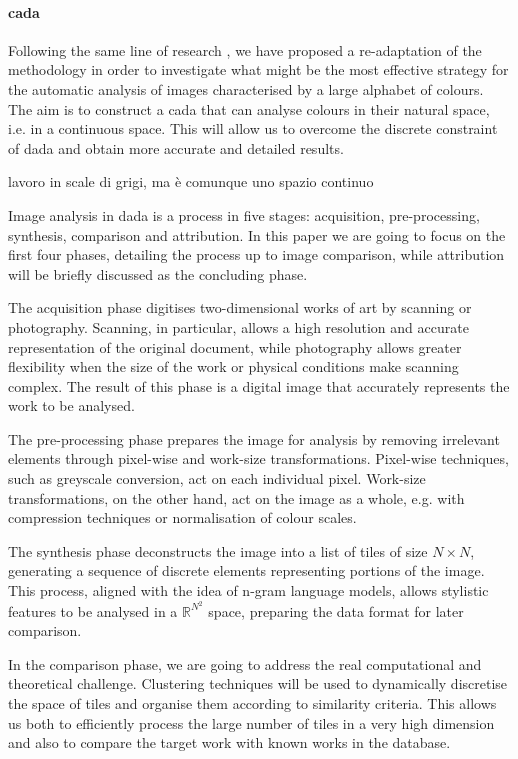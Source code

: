 \paragraph{\gls{cada}}
Following the same line of research \cite[my bachelor thesis]{thesis}, we have proposed a re-adaptation of the methodology in order to investigate what might be the most effective strategy for the automatic analysis of images characterised by a large alphabet of colours. The aim is to construct a \gls{cada} that can analyse colours in their natural space, i.e. in a continuous space. This will allow us to overcome the discrete constraint of \gls{dada} and obtain more accurate and detailed results.

\begin{note}
	lavoro in scale di grigi, ma è comunque uno spazio continuo
\end{note}

\noindent Image analysis in \gls{dada} is a process in five stages: acquisition, pre-processing, synthesis, comparison and attribution. In this paper we are going to focus on the first four phases, detailing the process up to image comparison, while attribution will be briefly discussed as the concluding phase.

\noindent The acquisition phase digitises two-dimensional works of art by scanning or photography. Scanning, in particular, allows a high resolution and accurate representation of the original document, while photography allows greater flexibility when the size of the work or physical conditions make scanning complex. The result of this phase is a digital image that accurately represents the work to be analysed.

\noindent The pre-processing phase prepares the image for analysis by removing irrelevant elements through pixel-wise and work-size transformations. Pixel-wise techniques, such as greyscale conversion, act on each individual pixel. Work-size transformations, on the other hand, act on the image as a whole, e.g. with compression techniques or normalisation of colour scales.

\noindent The synthesis phase deconstructs the image into a list of tiles of size $N\times N$, generating a sequence of discrete elements representing portions of the image. This process, aligned with the idea of n-gram language models, allows stylistic features to be analysed in a $\mathbb{R}^{N^2}$ space, preparing the data format for later comparison.

\noindent In the comparison phase, we are going to address the real computational and theoretical challenge. Clustering techniques will be used to dynamically discretise the space of tiles and organise them according to similarity criteria. This allows us both to efficiently process the large number of tiles in a very high dimension and also to compare the target work with known works in the database.

